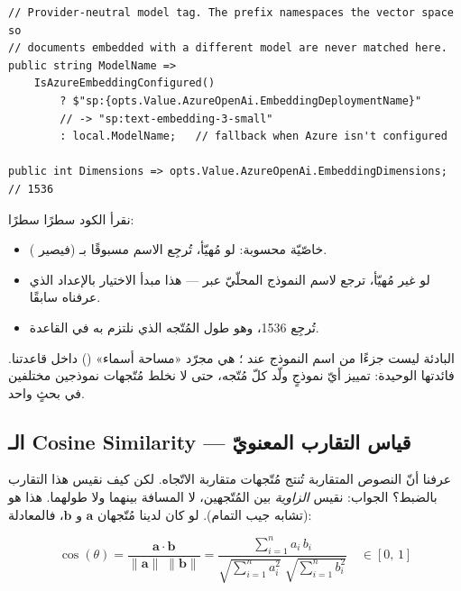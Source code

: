 \begin{english}
\begin{lstlisting}[language={[Sharp]C}]
// Provider-neutral model tag. The prefix namespaces the vector space so
// documents embedded with a different model are never matched here.
public string ModelName =>
    IsAzureEmbeddingConfigured()
        ? $"sp:{opts.Value.AzureOpenAi.EmbeddingDeploymentName}"
        // -> "sp:text-embedding-3-small"
        : local.ModelName;   // fallback when Azure isn't configured

public int Dimensions => opts.Value.AzureOpenAi.EmbeddingDimensions; // 1536
\end{lstlisting}
\end{english}

نقرأ الكود سطرًا سطرًا:
\begin{itemize}
  \item {} خاصّيّة محسوبة: لو  مُهيّأ، تُرجِع الاسم مسبوقًا
    بـ  (فيصير ).
  \item لو  غير مُهيّأ، ترجع لاسم النموذج المحلّيّ عبر 
    — هذا مبدأ الاختيار بالإعداد الذي عرفناه سابقًا.
  \item {} تُرجِع 1536، وهو طول المُتّجه الذي نلتزم به في القاعدة.
\end{itemize}

\begin{note}
البادئة  ليست جزءًا من اسم النموذج عند ؛ هي مجرّد «مساحة أسماء»
() داخل قاعدتنا. فائدتها الوحيدة: تمييز أيّ نموذجٍ ولّد كلّ مُتّجه،
حتى لا نخلط مُتّجهات نموذجين مختلفين في بحثٍ واحد.
\end{note}

\subsection{الـ Cosine Similarity — قياس التقارب المعنويّ}

عرفنا أنّ النصوص المتقاربة تُنتج مُتّجهات متقاربة الاتّجاه. لكن كيف نقيس هذا التقارب
بالضبط؟ الجواب: نقيس \emph{الزاوية} بين المُتّجهين، لا المسافة بينهما ولا طولهما.
هذا هو  (تشابه جيب التمام). لو كان لدينا مُتّجهان
$\mathbf{a}$ و $\mathbf{b}$، فالمعادلة:

\[
\cos(\theta)
= \frac{\mathbf{a}\cdot\mathbf{b}}{\|\mathbf{a}\|\;\|\mathbf{b}\|}
= \frac{\displaystyle\sum_{i=1}^{n} a_i\, b_i}
       {\displaystyle\sqrt{\sum_{i=1}^{n} a_i^2}\;\sqrt{\sum_{i=1}^{n} b_i^2}}
\quad\in[0,\,1]
\]

